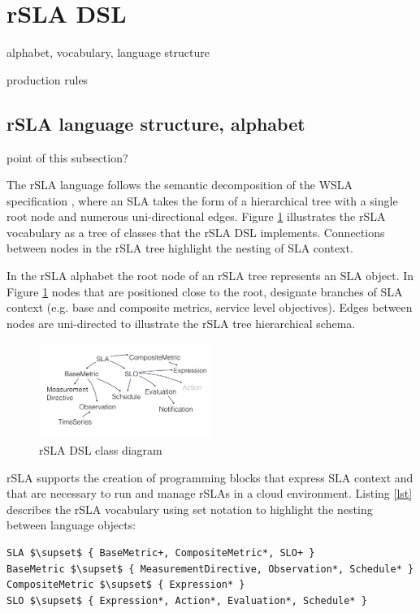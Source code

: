 \section{rSLA DSL}
\label{sec:dsl}
alphabet, vocabulary, language structure

production rules


\subsection{rSLA language structure, alphabet}

 point of this subsection?

The rSLA language follows the semantic decomposition of the WSLA specification \cite{wsla}, where an SLA takes the form of a hierarchical tree with a 
single root node and numerous uni-directional edges. Figure \ref{rSLA_diag} illustrates the rSLA vocabulary as a tree of classes that the rSLA DSL 
implements. Connections between nodes in the rSLA tree highlight the nesting of SLA context. 

In the rSLA alphabet the root node of an rSLA tree represents an SLA object. In Figure \ref{rSLA_diag} nodes that are positioned close to the root, 
designate branches of SLA context (e.g. base and composite metrics, service level objectives). Edges between nodes are uni-directed to illustrate the 
rSLA tree hierarchical schema.

\begin{figure}
  \centering
    \includegraphics[width=0.5\textwidth]{pics/rslauser}
    \caption{rSLA DSL class diagram}
    \label{rSLA_diag}
\end{figure}

 rSLA supports the creation of programming blocks that express SLA context and that are necessary to run and manage rSLAs in a cloud environment. 
Listing \ref{lst} describes the rSLA vocabulary using set notation to highlight the nesting between language objects:
\begin{lstlisting}[breaklines, mathescape, firstnumber=auto, caption=rSLA vocabulary, label=lst]
SLA $\supset$ { BaseMetric+, CompositeMetric*, SLO+ }
BaseMetric $\supset$ { MeasurementDirective, Observation*, Schedule* }
CompositeMetric $\supset$ { Expression* }
SLO $\supset$ { Expression*, Action*, Evaluation*, Schedule* }
\end{lstlisting}

